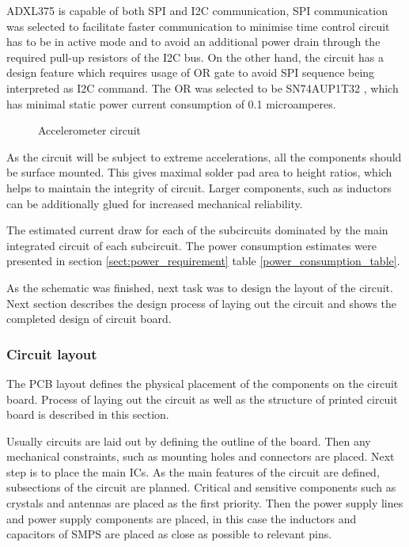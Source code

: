 ADXL375 is capable of both SPI and I2C communication, SPI communication was selected to facilitate faster communication to minimise time control circuit has to be in active mode and to avoid an additional power drain through the required pull-up resistors of the I2C bus. On the other hand, the circuit has a design feature which requires usage of OR gate to avoid SPI sequence being interpreted as I2C command. The OR was selected to be SN74AUP1T32 \cite{orgate}, which has minimal static power current consumption of 0.1 microamperes. 

\begin{figure}
    \centering
    \def\svgwidth{\columnwidth}
    
    \caption{\label{fig:sensor_circuit} Accelerometer circuit}
\end{figure}

As the circuit will be subject to extreme accelerations, all the components should be surface mounted. This gives maximal solder pad area to height ratios, which helps to maintain the integrity of circuit. Larger components, such as inductors can be additionally glued for increased mechanical reliability.

The estimated current draw for each of the subcircuits dominated by the main integrated circuit of each subcircuit. The power consumption estimates were presented in section \ref{sect:power_requirement} table \ref{power_consumption_table}.

As the schematic was finished, next task was to design the layout of the circuit. Next section describes the design process of laying out the circuit and shows the completed design of circuit board.

\subsubsection{Circuit layout}
The PCB layout defines the physical placement of the components on the circuit board. Process of laying out the circuit as well as the structure of printed circuit board is described in this section.

Usually circuits are laid out by defining the outline of the board. Then any mechanical constraints, such as mounting holes and connectors are placed. Next step is to place the main ICs. As the main features of the circuit are defined, subsections of the circuit are planned. Critical and sensitive components such as crystals and antennas are placed as the first priority. Then the power supply lines and power supply components are placed, in this case the inductors and capacitors of SMPS are placed as close as possible to relevant pins. 

